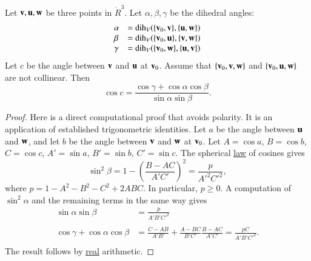 \begin{lemma}
\label{lemma:sloc2}  Let
  ${\mathbf v},{\mathbf u},{\mathbf w}$ be three points in $\ring{R}^3$.  Let
  $\alpha,\beta,\gamma$ be the dihedral angles:
\begin{displaymath}
\begin{array}{lll}
\alpha &= \operatorname{dih}_V(\{{\mathbf v}_0,{\mathbf v}\},\{{\mathbf u},{\mathbf w}\})\\
\beta &= \operatorname{dih}_V(\{{\mathbf v}_0,{\mathbf u}\},\{{\mathbf v},{\mathbf w}\})\\
\gamma&= \operatorname{dih}_V(\{{\mathbf v}_0,{\mathbf w}\},\{{\mathbf u},{\mathbf v}\})\\
\end{array}
\end{displaymath}
Let $c$ be the
angle between ${\mathbf v}$ and ${\mathbf u}$ at ${\mathbf v}_0$. 
Assume that $\{{\mathbf v}_0,{\mathbf v},{\mathbf w}\}$ and $\{{\mathbf v}_0,{\mathbf u},{\mathbf w}\}$ are not collinear.
Then
\begin{displaymath}
\cos c = \frac{\cos \gamma + \cos \alpha \cos \beta}
{\sin \alpha\sin \beta}.
\end{displaymath}
\end{lemma}
%
%

\begin{proof}  
  Here is a direct computational proof that avoids polarity.  It is an
  application of established trigonometric identities.  Let $a$ be the
  angle between ${\mathbf u}$ and ${\mathbf w}$, and let $b$ be the angle between ${\mathbf v}$
  and ${\mathbf w}$ at ${\mathbf v}_0$.  Let $A=\cos a$, $B=\cos b$, $C=\cos c$,
  $A'=\sin a$, $B'=\sin b$, $C'=\sin c$.  The spherical
  \hyperref[lemma:sloc]{law} of cosines gives
\begin{displaymath}\sin^2\beta = 1-\left(\frac{B-A C}{A' C'}\right)^2
  = \frac{p}{A'^2 C'^2},\end{displaymath}
where $p=1-A^2 - B^2 - C^2 + 2 A B C$.
In particular, $p\ge 0$.
%
A computation of $\sin^2\alpha$ and the remaining terms in the same way gives
\begin{displaymath}
\begin{array}{lll}
  \sin\alpha\sin\beta &= \frac{\displaystyle p}{\displaystyle A' B' C'^2}\\ 
  \\
  \cos\gamma + \cos\alpha \cos\beta &=
  \frac{\displaystyle C - A B}{\displaystyle A' B'} + 
\frac{\displaystyle A - B C}{\displaystyle B' C'} 
\frac{\displaystyle B - A C}{\displaystyle A' C'}
  = \frac{\displaystyle p C}{\displaystyle A' B' C'^2}.\\
\end{array}
\end{displaymath}
The result follows by \hyperref[back:analysis]{real} arithmetic.
\end{proof}

